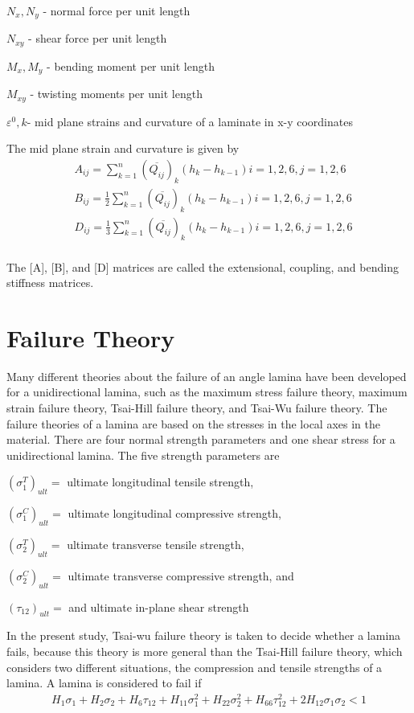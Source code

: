 \documentclass[USenglish]{article}
\begin{document}
$N_x,N_y $  - normal force per unit length

$N_{xy} $  - shear force per unit length

$M_x, M_y $ - bending moment per unit length

$M_{xy} $  - twisting moments per unit length

$\varepsilon^{0}, k $- mid plane strains and curvature of a laminate in x-y coordinates

The mid plane strain and curvature is given by
\begin{equation}
    \begin{split}
    &A_{ij}=\sum_{k=1}^{n}(\overline{Q_{ij}})_k(h_k-h_{k-1})  i=1,2,6, j=1,2,6\\
    &B_{ij}=\frac{1}{2}\sum_{k=1}^{n}(\overline{Q_{ij}})_k(h_k-h_{k-1})  i=1,2,6, j=1,2,6\\
    &D_{ij}=\frac{1}{3}\sum_{k=1}^{n}(\overline{Q_{ij}})_k(h_k-h_{k-1}) i=1,2,6, j=1,2,6\\
    \end{split}
\end{equation}

The [A], [B], and [D] matrices are called the extensional, coupling, and bending stiffness matrices.


\section{Failure Theory}
Many different theories about the failure of an angle lamina have been developed for a
unidirectional lamina, such as the maximum stress failure theory, maximum strain failure theory,
Tsai-Hill failure theory, and Tsai-Wu failure theory. The failure theories of a lamina are based on
the stresses in the local axes in the material. There are four normal strength parameters and one shear
stress for a unidirectional lamina. The five strength parameters are

$(\sigma _1^{T})_{ult}= $ ultimate longitudinal tensile strength,

$(\sigma _1^{C})_{ult}= $ ultimate longitudinal compressive strength,

$(\sigma _2^{T})_{ult}= $ ultimate transverse tensile strength,

$(\sigma _2^{C})_{ult}= $ ultimate transverse compressive strength, and

$(\tau_{12})_{ult}= $ and ultimate in-plane shear strength

In the present study, Tsai-wu failure theory is taken to decide whether a lamina fails,
because this theory is more general than the Tsai-Hill failure theory, which considers two
different situations, the compression and tensile strengths of a lamina. A lamina is considered to fail
if \begin{equation} \label{eq:tsai_wu}
\begin{split}
	H_1 \sigma_1  + H_2 \sigma_2 + H_6 \tau_{12} + H_{11}\sigma_1^2 + H_{22} \sigma_2^2 
                  + H_{66}  \tau_{12}^2 + 2H_{12}\sigma_1\sigma_2 < 1
\end{split}
\end{equation}
\end{document}
